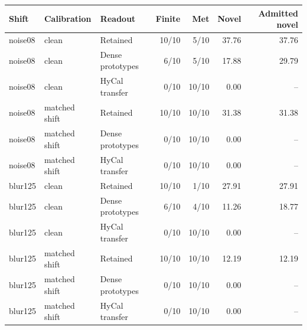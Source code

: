 \begin{tabular}{@{}lllrrrr@{}}
\toprule
Shift & Calibration & Readout & Finite & Met & Novel & Admitted novel \\
\midrule
noise08 & clean & Retained & 10/10 & 5/10 & 37.76 & 37.76 \\
noise08 & clean & Dense prototypes & 6/10 & 5/10 & 17.88 & 29.79 \\
noise08 & clean & HyCal transfer & 0/10 & 10/10 & 0.00 & -- \\
noise08 & matched shift & Retained & 10/10 & 10/10 & 31.38 & 31.38 \\
noise08 & matched shift & Dense prototypes & 0/10 & 10/10 & 0.00 & -- \\
noise08 & matched shift & HyCal transfer & 0/10 & 10/10 & 0.00 & -- \\
blur125 & clean & Retained & 10/10 & 1/10 & 27.91 & 27.91 \\
blur125 & clean & Dense prototypes & 6/10 & 4/10 & 11.26 & 18.77 \\
blur125 & clean & HyCal transfer & 0/10 & 10/10 & 0.00 & -- \\
blur125 & matched shift & Retained & 10/10 & 10/10 & 12.19 & 12.19 \\
blur125 & matched shift & Dense prototypes & 0/10 & 10/10 & 0.00 & -- \\
blur125 & matched shift & HyCal transfer & 0/10 & 10/10 & 0.00 & -- \\
\bottomrule
\end{tabular}
